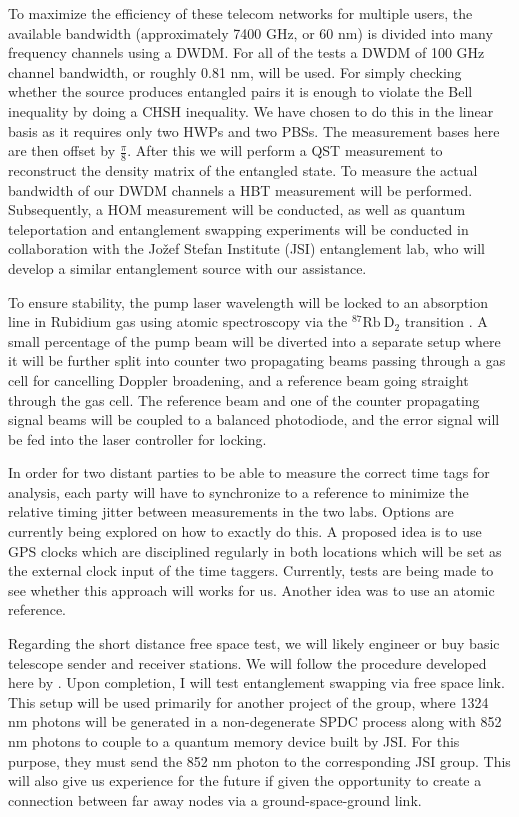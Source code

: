 \documentclass{article}
\begin{document}
\par To maximize the efficiency of these telecom networks for multiple users, the available bandwidth (approximately 7400 GHz, or 60 nm)
is divided into many frequency channels using a DWDM.
For all of the tests a DWDM of 100 GHz channel bandwidth, or roughly 0.81 nm, will be used.
For simply checking whether the source produces entangled pairs it is enough
to violate the Bell inequality by doing a CHSH \cite{Clauser_Horne_Shimony_Holt_1969} inequality.
We have chosen to do this in the linear basis as it requires
only two HWPs and two PBSs. The measurement bases here are then offset by $\frac{\pi}{8}$. After this
we will perform a QST measurement to reconstruct \cite{James_Kwiat_Munro_White_2001} the density matrix of the entangled state.
To measure the actual bandwidth of our DWDM channels a HBT measurement will be performed.
Subsequently, a HOM measurement will be conducted, as well as quantum teleportation \cite{Bouwmeester_Pan_Mattle_Eibl_Weinfurter_Zeilinger_1997}
and entanglement swapping \cite{Jennewein_Weihs_Pan_Zeilinger_2001} experiments will be conducted in collaboration with the Jožef Stefan Institute (JSI)
entanglement lab, who will develop a similar entanglement source with our assistance.

To ensure stability, the pump laser wavelength will be locked to an absorption line in Rubidium gas using atomic spectroscopy
via the $\mathrm{^{87}Rb\ D_2}$ transition \cite{metger2017sas}. A small percentage of the pump beam will be diverted into a separate
setup where it will be further split into counter two propagating beams passing through a gas cell for cancelling Doppler broadening,
and a reference beam going straight through the gas cell. The reference beam and one of the counter propagating signal beams will be
coupled to a balanced photodiode, and the error signal will be fed into the laser controller for locking.

In order for two distant parties to be able to measure the correct time tags for analysis, each party will have to synchronize
to a reference to minimize the relative timing jitter between measurements in the two labs. Options are currently being explored on how to exactly do this.
A proposed idea is to use GPS clocks which are disciplined regularly in both locations which will be set as the external clock input of the time taggers.
Currently, tests are being made to see whether this approach will works for us. Another idea was to use an atomic reference.

Regarding the short distance free space test, we will likely engineer or buy basic telescope sender and receiver stations.
We will follow the procedure developed here by \cite{Kržič_2024}. Upon completion, I will test entanglement swapping via free space
link. This setup will be used primarily for another project of the group, where 1324 nm photons will be generated in a non-degenerate SPDC process
along with 852 nm photons to couple to a quantum memory device built by JSI. For this purpose, they must send the 852 nm photon
to the corresponding JSI group. This will also give us experience for the future if given the opportunity to create a connection between
far away nodes via a ground-space-ground link.
\end{document}
